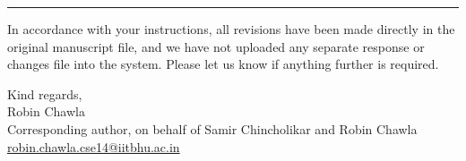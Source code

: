 \documentclass[11pt]{article}
\begin{document}
\vspace{6pt}
\hrule
\vspace{6pt}

In accordance with your instructions, all revisions have been made directly in the original manuscript file, and we have not uploaded any separate response or changes file into the system. Please let us know if anything further is required.

\vspace{10pt}
Kind regards,\\[2pt]
Robin Chawla\\
Corresponding author, on behalf of Samir Chincholikar and Robin Chawla\\
\href{mailto:robin.chawla.cse14@iitbhu.ac.in}{robin.chawla.cse14@iitbhu.ac.in}
\end{document}
